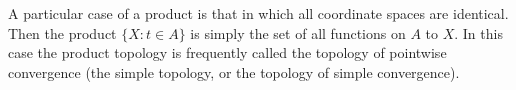 A particular case of a product is that in which all coordinate spaces are identical. Then the product $\{X: t \in A\}$ is simply the set of all functions on $A$ to $X$. In this case the product topology is frequently called the topology of pointwise convergence (the simple topology, or the topology of simple convergence).
